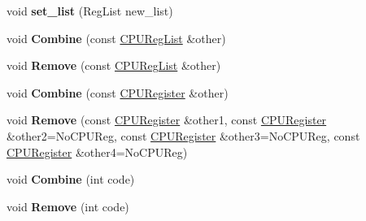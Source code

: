 \begin{DoxyCompactItemize}
\item 
void {\bfseries set\+\_\+list} (Reg\+List new\+\_\+list)\hypertarget{classv8_1_1internal_1_1_c_p_u_reg_list_ae2b98041d850628fadec5189229dc7d0}{}\label{classv8_1_1internal_1_1_c_p_u_reg_list_ae2b98041d850628fadec5189229dc7d0}

\item 
void {\bfseries Combine} (const \hyperlink{classv8_1_1internal_1_1_c_p_u_reg_list}{C\+P\+U\+Reg\+List} \&other)\hypertarget{classv8_1_1internal_1_1_c_p_u_reg_list_ab6666cd64473fcf6b9bf157c52c4afe9}{}\label{classv8_1_1internal_1_1_c_p_u_reg_list_ab6666cd64473fcf6b9bf157c52c4afe9}

\item 
void {\bfseries Remove} (const \hyperlink{classv8_1_1internal_1_1_c_p_u_reg_list}{C\+P\+U\+Reg\+List} \&other)\hypertarget{classv8_1_1internal_1_1_c_p_u_reg_list_a093ef3110e5fcf14f834eb210b2c5a65}{}\label{classv8_1_1internal_1_1_c_p_u_reg_list_a093ef3110e5fcf14f834eb210b2c5a65}

\item 
void {\bfseries Combine} (const \hyperlink{structv8_1_1internal_1_1_c_p_u_register}{C\+P\+U\+Register} \&other)\hypertarget{classv8_1_1internal_1_1_c_p_u_reg_list_a463ddb8efa62362190f8ec187cb9bf44}{}\label{classv8_1_1internal_1_1_c_p_u_reg_list_a463ddb8efa62362190f8ec187cb9bf44}

\item 
void {\bfseries Remove} (const \hyperlink{structv8_1_1internal_1_1_c_p_u_register}{C\+P\+U\+Register} \&other1, const \hyperlink{structv8_1_1internal_1_1_c_p_u_register}{C\+P\+U\+Register} \&other2=No\+C\+P\+U\+Reg, const \hyperlink{structv8_1_1internal_1_1_c_p_u_register}{C\+P\+U\+Register} \&other3=No\+C\+P\+U\+Reg, const \hyperlink{structv8_1_1internal_1_1_c_p_u_register}{C\+P\+U\+Register} \&other4=No\+C\+P\+U\+Reg)\hypertarget{classv8_1_1internal_1_1_c_p_u_reg_list_adfa7d665009cdd077ca4001c1fa2a451}{}\label{classv8_1_1internal_1_1_c_p_u_reg_list_adfa7d665009cdd077ca4001c1fa2a451}

\item 
void {\bfseries Combine} (int code)\hypertarget{classv8_1_1internal_1_1_c_p_u_reg_list_a583e6f37f6ca75ea794e28fc61d44ef8}{}\label{classv8_1_1internal_1_1_c_p_u_reg_list_a583e6f37f6ca75ea794e28fc61d44ef8}

\item 
void {\bfseries Remove} (int code)\hypertarget{classv8_1_1internal_1_1_c_p_u_reg_list_a793409f12364f86f730fdcfd7f06a13e}{}\label{classv8_1_1internal_1_1_c_p_u_reg_list_a793409f12364f86f730fdcfd7f06a13e}


\end{DoxyCompactItemize}
